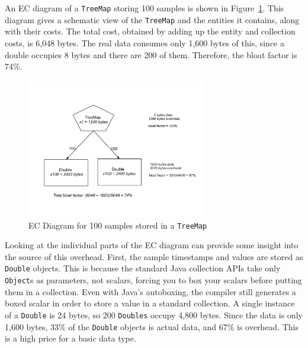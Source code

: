 An EC diagram of a \texttt{TreeMap} storing 100 samples is shown in Figure~\ref{fig:content-schematic-treemap-doubles}.  This diagram gives a schematic view of the \texttt{TreeMap} and the entities it contains, along with their costs. The total cost, obtained by adding up the entity and collection costs, is 6,048 bytes. The real data consumes only 1,600 bytes of this, since a double occupies 8 bytes and there are 200 of them. Therefore, the bloat factor is 74\%.  

\begin{figure}
  \centering
  \includegraphics[width=0.7\textwidth]{Figures/chapter3/treemap-doubles}
  \caption{EC Diagram for 100 samples stored in a \texttt{TreeMap}}
  \label{fig:content-schematic-treemap-doubles}
\end{figure} 
 
Looking at the individual parts of the EC diagram can provide some insight into the source of this overhead. First, the sample timestamps and values are stored as \texttt{Double} objects. This is because the standard Java collection APIs take only \texttt{Object}s as parameters, not scalars, forcing you to box your scalars before putting them in a collection. Even with Java's autoboxing, the compiler still generates a boxed scalar in order to store a value in a standard collection.  A single instance of a \texttt{Double} is 24 bytes, so 200 \texttt{Doubles} occupy 4,800 bytes. Since the data is only 1,600 bytes,  33\% of the \texttt{Double} objects is actual data, and 67\% is overhead. This is a high price for a basic data type. 




